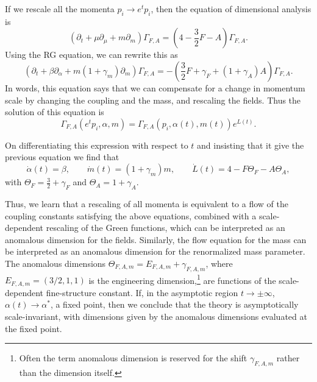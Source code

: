 If we rescale all the momenta $p_i\to e^t p_i$, then the equation of
dimensional analysis is
\[
  \left(\partial_t+\mu\partial_\mu+m\partial_m\right)\Gamma_{F,A}
  =\left(4-\frac32F-A\right)\Gamma_{F,A}.
\]
Using the RG equation, we can rewrite this as
\[
  \left(\partial_t+\beta\partial_\alpha
  +m(1+\gamma_m)\partial_m\right)\Gamma_{F,A}
  =-\left(\frac32F+\gamma_F+(1+\gamma_A)A\right)\Gamma_{F,A}.
\]
In words, this equation says that we can compensate for a change in momentum
scale by changing the coupling and the mass, and rescaling the fields. Thus the
solution of this equation is
\[
  \Gamma_{F,A}(e^t p_i,\alpha,m)
  =\Gamma_{F,A}(p_i,\alpha(t),m(t))e^{L(t)}.
\]

On differentiating this expression with respect to $t$ and insisting that it
give the previous equation we find that
\[
  \dot\alpha(t)=\beta,
  \qquad
  \dot m(t)=(1+\gamma_m)m,
  \qquad
  \dot L(t)=4-F\Theta_F-A\Theta_A,
\]
with $\Theta_F=\frac32+\gamma_F$ and $\Theta_A=1+\gamma_A$.

Thus, we learn that a rescaling of all momenta is equivalent to a flow of the
coupling constants satisfying the above equations, combined with a
scale-dependent rescaling of the Green functions, which can be interpreted as
an anomalous dimension for the fields. Similarly, the flow equation for the
mass can be interpreted as an anomalous dimension for the renormalized mass
parameter. The anomalous dimensions $\Theta_{F,A,m}=E_{F,A,m}+\gamma_{F,A,m}$,
where $E_{F,A,m}=(3/2,1,1)$ is the engineering dimension,\footnote[13]{Often
the term anomalous dimension is reserved for the shift $\gamma_{F,A,m}$ rather
than the dimension itself.} are functions of the scale-dependent
fine-structure constant. If, in the asymptotic region $t\to\pm\infty$,
$\alpha(t)\to\alpha^*$, a fixed point, then we conclude that the theory is
asymptotically scale-invariant, with dimensions given by the anomalous
dimensions evaluated at the fixed point.

